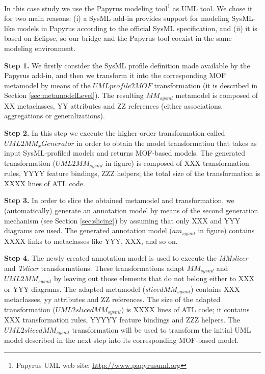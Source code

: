 
In this case study we use the Papyrus modeling tool\footnote{Papyrus UML web site: \small{\url{http://www.papyrusuml.org}}} as UML
tool. We chose it for two main reasons: (i) a SysML add-in provides support for modeling SysML-like models in Papyrus according to
the official SysML specification,
and (ii) it is based on Eclipse, so our bridge and the Papyrus tool coexist in the same modeling environment.

\textbf{Step 1.} We firstly consider the SysML profile definition made available by the Papyrus add-in,
and then we transform it into the corresponding MOF metamodel
by means of the $UMLprofile2MOF$ transformation (it is described in Section \ref{sec:metamodelLevel}). 
The resulting $MM_{sysml}$ metamodel is composed of XX metaclasses, YY attributes and ZZ references 
(either associations, aggregations or generalizations).

\textbf{Step 2.} In this step we execute the higher-order transformation called $UML2MM_xGenerator$ in order to obtain the
model transformation that takes as input SysML-profiled models and returns MOF-based models. The generated transformation 
($UML2MM_{sysml}$ in figure) is composed of XXX transformation rules, YYYY feature bindings, ZZZ helpers; the total size of the transformation is XXXX lines of ATL code.

\textbf{Step 3.} In order to slice the obtained metamodel and transformation, 
we (automatically) generate an annotation model by means of the second generation mechanism
(see Section \ref{sec:slicing}) by assuming that only XXX and YYY diagrams are used.
The generated annotation model ($am_{sysml}$ in figure) contains XXXX links to metaclasses like YYY, XXX, and so on.

\textbf{Step 4.} The newly created annotation model is used to execute the \textit{MMslicer} and \textit{Tslicer} transformations.
These transformations adapt $MM_{sysml}$ and $UML2MM_{sysml}$ by leaving out those elements that do not belong either to XXX or YYY diagrams. 
The adapted metamodel ($slicedMM_{sysml}$) contains XXX metaclasses, yy attributes and ZZ references. 
The size of the adapted transformation ($UML2slicedMM_{sysml}$) is XXXX lines 
of ATL code; it contains XXX transformation rules, YYYYY feature bindings and ZZZ helpers. 
The $UML2slicedMM_{sysml}$ transformation will be used to transform the initial UML model described in the next step into its 
corresponding MOF-based model.

